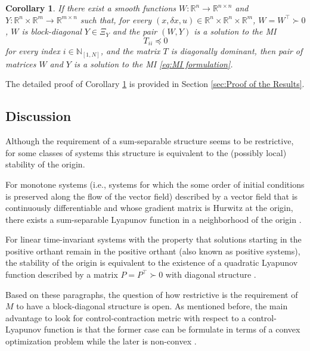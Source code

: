 \documentclass[10pt,twocolumn,twoside]{IEEEtran}
\theoremstyle{plain}
\newtheorem{corollary}[theorem]{Corollary}
\theoremstyle{definition}
\theoremstyle{remark}
\begin{document}
\begin{corollary}\label{cor:distributed computation}
	 If there exist a smooth functions $W:\mathbb{R}^n\to\mathbb{R}^{n\times n}$ and $Y:\mathbb{R}^n\times\mathbb{R}^m\to\mathbb{R}^{m\times n}$ such that, for every $(x,\delta x,u)\in\mathbb{R}^n\times\mathbb{R}^n\times\mathbb{R}^m$, $W=W^\top\succ0$, $W$ is block-diagonal $Y\in\Xi_Y$ and the pair $(W,Y)$ is a solution to the MI
	\begin{equation}\label{eq:MI formulation:i}
		T_{ii}\preceq 0
	\end{equation}
	for every index $i\in\mathbb{N}_{[1,N]}$, and the matrix $T$ is diagonally dominant, then pair of matrices $W$ and $Y$ is a solution to the MI \eqref{eq:MI formulation}.
\end{corollary}

The detailed proof of Corollary \ref{cor:distributed computation} is provided in Section \ref{sec:Proof of the Results}.


\subsection{Discussion}

Although the requirement of a sum-separable structure seems to be restrictive, for some classes of systems this structure is equivalent to the (possibly local) stability of the origin. 

For monotone systems (i.e., systems for which the some order of initial conditions is preserved along the flow of the vector field) described by a vector field that is continuously differentiable and whose gradient matrix is Hurwitz at the origin, there exists a sum-separable Lyapunov function in a neighborhood of the origin \cite[Theorem 3.4]{Dirr2015}. 

For linear time-invariant systems with the property that solutions starting in the positive orthant remain in the positive orthant (also known as positive systems), the stability of the origin is equivalent to the existence of a quadratic Lyapunov function described by a matrix $P=P^\top\succ0$ with diagonal structure \cite{Tanaka2011}. 


Based on these paragraphs, the question of how restrictive is the requirement of $M$ to have a block-diagonal structure is open. As mentioned before, the main advantage to look for control-contraction metric with respect to a control-Lyapunov function is that the former case can be formulate in terms of a convex optimization problem while the later is non-convex \cite{Rantzer:2001}.
\end{document}
